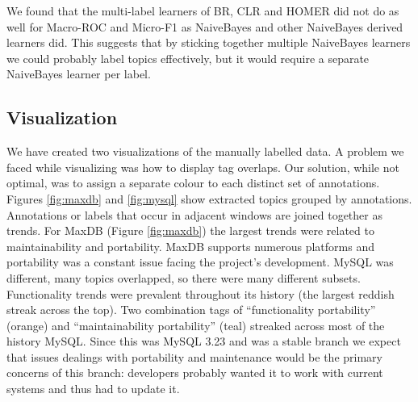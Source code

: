 \documentclass{acm_proc_article-sp}
\begin{document}
We found that the multi-label learners of BR, CLR and HOMER did not do as well for Macro-ROC and Micro-F1 as NaiveBayes and other NaiveBayes derived learners did. This suggests that by sticking together multiple NaiveBayes learners we could probably label topics effectively, but it would require a separate NaiveBayes learner per label.

\subsection{Visualization}

We have created two visualizations of the manually labelled data. A problem we faced while visualizing was how to display tag overlaps. Our solution, while not optimal, was to assign a separate colour to each distinct set of annotations. Figures \ref{fig:maxdb} and \ref{fig:mysql} show extracted topics grouped by annotations. Annotations or labels that occur in adjacent windows are joined together as trends. For MaxDB (Figure \ref{fig:maxdb}) the largest trends were related to maintainability and portability. MaxDB supports numerous platforms and portability was a constant issue facing the project's development. MySQL was different, many topics overlapped, so there were many different subsets. Functionality trends were prevalent throughout its history (the largest reddish streak across the top). Two combination  tags of ``functionality portability'' (orange) and ``maintainability portability'' (teal) streaked across most of the history MySQL. Since this was MySQL 3.23 and was a stable branch we expect that issues dealings with portability and maintenance would be the primary concerns of this branch: developers probably wanted it to work with current systems and thus had to update it.
\end{document}
